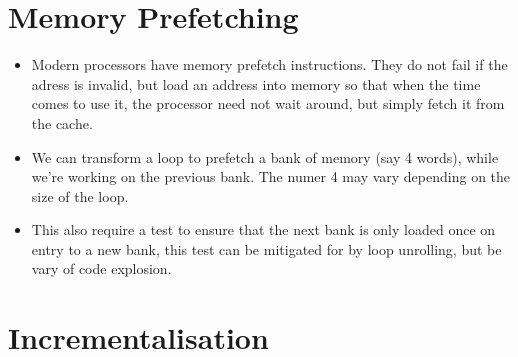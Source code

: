 \section{Memory Prefetching}

\begin{itemize}

\item Modern processors have memory prefetch instructions. They do not fail if
the adress is invalid, but load an address into memory so that when the time
comes to use it, the processor need not wait around, but simply fetch it from
the cache.

\item We can transform a loop to prefetch a bank of memory (say 4 words), while
we're working on the previous bank. The numer 4 may vary depending on the size
of the loop.

\item This also require a test to ensure that the next bank is only loaded once
on entry to a new bank, this test can be mitigated for by loop unrolling, but
be vary of code explosion.

\end{itemize}

\section{Incrementalisation}


